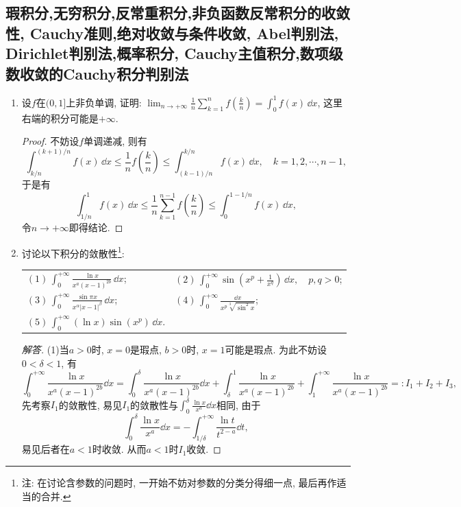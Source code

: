 \subsection{瑕积分,无穷积分,反常重积分,非负函数反常积分的收敛性, Cauchy准则,绝对收敛与条件收敛, Abel判别法, Dirichlet判别法,概率积分, Cauchy主值积分,数项级数收敛的Cauchy积分判别法}
\begin{a}
\begin{enumerate}
\item 设\(f\)在\((0,1]\)上非负单调, 证明: \(\lim_{n\rightarrow+\infty}\frac{1}{n}\sum_{k=1}^{n}f\left(\frac{k}{n}\right)=\int_{0}^{1}f(x)\,\dd x\), 这里右端的积分可能是\(+\infty\).
\begin{proof}
不妨设\(f\)单调递减, 则有\[\int_{k/n}^{(k+1)/n}f(x)\,\dd x
\leqslant \frac{1}{n}f\left(\frac{k}{n}\right)
\leqslant\int_{(k-1)/n}^{k/n}f(x)\,\dd x,\quad k=1,2,\cdots,n-1,\]
于是有\[\int_{1/n}^{1}f(x)\,\dd x
\leqslant\frac{1}{n}\sum_{k=1}^{n-1}f\left(\frac{k}{n}\right)
\leqslant\int_{0}^{1-1/n}f(x)\,\dd x,\]
令\(n\rightarrow+\infty\)即得结论.
\end{proof}
\item 讨论以下积分的敛散性\footnote{注: 在讨论含参数的问题时, 一开始不妨对参数的分类分得细一点, 最后再作适当的合并.}:\\
\begin{center}\begin{tabular}{ll}
\((1)\,\int_{0}^{+\infty}\frac{\ln x}{x^a(x-1)^{2b}}\,\dd x\);&\((2)\,\int_{0}^{+\infty}\sin(x^p+\frac{1}{x^q})\,\dd x,\quad p,q>0\);\\
\((3)\,\int_{0}^{+\infty}\frac{\sin \pi x}{x^\alpha|x-1|^\beta}\,\dd x\);&\((4)\,\int_{0}^{+\infty}\frac{\dd x}{x^p\sqrt[3]{\sin^2x}}\);\\
\((5)\,\int_{0}^{+\infty}\left(\ln x\right)\sin (x^p)\,\dd x\).&
\end{tabular}\end{center}
\begin{proof}[解答]
(1)当\(a>0\)时, \(x=0\)是瑕点, \(b>0\)时, \(x=1\)可能是瑕点. 
为此不妨设\(0<\delta<1\), 有\[\int_{0}^{+\infty}\frac{\ln x}{x^a(x-1)^{2b}}\dd x
=\int_{0}^{\delta}\frac{\ln x}{x^a(x-1)^{2b}}\dd x+\int_{\delta}^{1}\frac{\ln x}{x^a(x-1)^{2b}}+\int_{1}^{+\infty}\frac{\ln x}{x^a(x-1)^{2b}}=:I_1+I_2+I_3,\]
先考察\(I_1\)的敛散性, 易见\(I_1\)的敛散性与\(\int_{0}^{\delta}\frac{\ln x}{x^a}\dd x\)相同, 由于
\[\int_{0}^{\delta}\frac{\ln x}{x^a}\dd x=-\int_{1/\delta}^{+\infty}\frac{\ln t}{t^{2-a}}\dd t,\]
易见后者在\(a<1\)时收敛. 从而\(a<1\)时\(I_1\)收敛.


\end{proof}
\end{enumerate}
\end{a}
